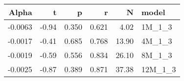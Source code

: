 \begin{table}[ht]
\centering
\begin{tabular}{rrrrrl}
  \hline
Alpha & t & p & r & N & model \\ 
  \hline
-0.0063 & -0.94 & 0.350 & 0.621 & 4.02 & 1M\_1\_3 \\ 
  -0.0017 & -0.41 & 0.685 & 0.768 & 13.90 & 4M\_1\_3 \\ 
  -0.0019 & -0.59 & 0.556 & 0.834 & 26.10 & 8M\_1\_3 \\ 
  -0.0025 & -0.87 & 0.389 & 0.871 & 37.38 & 12M\_1\_3 \\ 
   \hline
\end{tabular}
\end{table}

